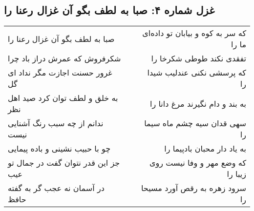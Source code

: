 \begin{center}
\section*{غزل شماره ۴: صبا به لطف بگو آن غزال رعنا را}
\label{sec:sh004}
\begin{longtable}{l p{0.5cm} r}
صبا به لطف بگو آن غزال رعنا را
&&
که سر به کوه و بیابان تو داده‌ای ما را
\\
شکرفروش که عمرش دراز باد چرا
&&
تفقدی نکند طوطی شکرخا را
\\
غرور حسنت اجازت مگر نداد ای گل
&&
که پرسشی نکنی عندلیب شیدا را
\\
به خلق و لطف توان کرد صید اهل نظر
&&
به بند و دام نگیرند مرغ دانا را
\\
ندانم از چه سبب رنگ آشنایی نیست
&&
سهی قدان سیه چشم ماه سیما را
\\
چو با حبیب نشینی و باده پیمایی
&&
به یاد دار محبان بادپیما را
\\
جز این قدر نتوان گفت در جمال تو عیب
&&
که وضع مهر و وفا نیست روی زیبا را
\\
در آسمان نه عجب گر به گفته حافظ
&&
سرود زهره به رقص آورد مسیحا را
\\
\end{longtable}
\end{center}
